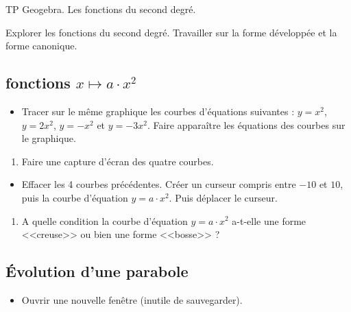 {
	


\begin{activity}{TP Geogebra. Les fonctions du second degré.}
\label{second_degre_TP}




\begin{objective}
Explorer les fonctions du second degré. Travailler sur la forme développée et la forme canonique.
\end{objective}


\subsection*{fonctions $x \mapsto a \cdot x^2$}  

\begin{itemize}
\item Tracer sur le même graphique  les courbes d'équations  suivantes : $y=x^2$, $y=2x^2$, $y=-x^2$ et $y=-3x^2$. Faire apparaître les équations des courbes sur le graphique.
\end{itemize}

\begin{enumerate}
\item Faire une capture  d'écran des quatre courbes.
\end{enumerate}


\begin{itemize}

\item Effacer les 4 courbes précédentes. Créer un curseur compris entre $-10$ et $10$, puis la courbe d'équation $y=a \cdot   x^2$. Puis déplacer le curseur.

\end{itemize}

\begin{enumerate}[resume]
\item A quelle condition la courbe d'équation $y=a \cdot x^2$ a-t-elle une forme <<creuse>> ou bien une forme <<bosse>> ?
\end{enumerate}





\medskip

\subsection*{Évolution d'une parabole}

\begin{itemize}
\item Ouvrir une nouvelle fenêtre (inutile de sauvegarder).


\end{itemize}
\end{activity}}
